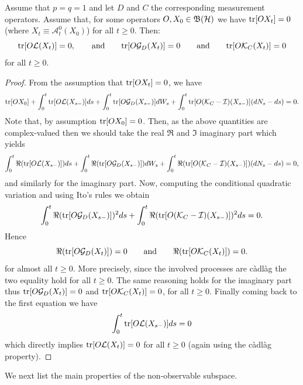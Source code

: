 \documentclass[aihp,12pt]{imsart}
\begin{document}
\begin{lemma}
\label{lem:trick}
    Assume that $p=q=1$ and let $D$ and $C$ the corresponding measurement operators. Assume that, for some operators $O,X_0\in\mathfrak{B}(\mathcal{H})$ we have ${\rm tr}[OX_t]=0$ (where $X_t\equiv \mathcal A_t^0 (X_0)$) for all $t\geq0$. Then: 
    \[{\rm tr}[O\mathcal{L}(X_t)]=0, \qquad\text{and}\qquad {\rm tr}[O\mathcal{G}_D(X_t)]=0 \qquad\text{and}\qquad {\rm tr}[O\mathcal{K}_C(X_t)]=0\] for all $t\geq0$. 
\end{lemma}
\begin{proof}
    From the assumption that ${\rm tr}[O X_t]=0$, we have
    \[{\rm tr}[O X_0] + \int_0^t {\rm tr}[O \mathcal{L}(X_{s-})]ds + \int_0^{t} {\rm tr}[O\mathcal{G}_D(X_{s-})]dW_s + \int_{0}^t {\rm tr}[O(\mathcal{K}_{C}-\mathcal{I})(X_{s-})](dN_s-ds) = 0.\]
    Note that, by assumption ${\rm tr}[O X_0]=0$. Then, as the above quantities are complex-valued then we should take the real $\Re$ and $\Im$ imaginary part which yields 
    \[\int_0^t \Re({\rm tr}[O \mathcal{L}(X_{s-})])ds + \int_0^{t} \Re({\rm tr}[O\mathcal{G}_D(X_{s-})])dW_s + \int_{0}^t \Re({\rm tr}[O(\mathcal{K}_{C}-\mathcal{I})(X_{s-})])(dN_s-ds) = 0,\]
    and similarly for the imaginary part. 
    Now, computing the conditional quadratic variation and using Ito's rules we obtain
    \[\int_0^t \Re({\rm tr}[O \mathcal{G}_D(X_{s-})])^2 ds + \int_{0}^t \Re({\rm tr}[O(\mathcal{K}_{C}-\mathcal{I})(X_{s-})])^2 ds = 0.\]
    Hence
    \[\Re({\rm tr}[O\mathcal{G}_{D}(X_t)])=0\qquad\text{and}\qquad \Re({\rm tr}[O\mathcal{K}_{C}(X_t)])=0.\] for almost all $t\geq0$. More precisely, since the involved processes are c\`adl\`ag the two equality hold for all $t\geq0$. The same reasoning holds for the imaginary part thus \({\rm tr}[O\mathcal{G}_{D}(X_t)]=0\) and \({\rm tr}[O\mathcal{K}_{C}(X_t)]=0\), for all $t\geq0$. Finally coming back to the first equation we have 
    \[\int_{0}^t {\rm tr}[O\mathcal{L}(X_{s-})]ds = 0\] which directly implies ${\rm tr}[O\mathcal{L}(X_t)] = 0$ for all $t\geq0$ (again using the c\`adl\`ag property).
\end{proof}


We next list the main properties of the non-observable subspace. 
 
\end{document}

